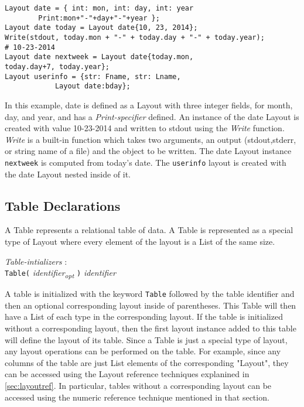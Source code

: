 \documentclass{article}
\begin{document}
\begin{lstlisting}
Layout date = { int: mon, int: day, int: year 
		Print:mon+"-"+day+"-"+year };
Layout date today = Layout date{10, 23, 2014};
Write(stdout, today.mon + "-" + today.day + "-" + today.year);
# 10-23-2014
Layout date nextweek = Layout date{today.mon, 
today.day+7, today.year};
Layout userinfo = {str: Fname, str: Lname, 	
			Layout date:bday};
\end{lstlisting}
In this example, date is defined as a Layout with three integer fields, for month, day, and year, and has a \emph{Print-specifier} defined. An instance of the date Layout is created with value 10-23-2014 and written to stdout using the \emph{Write} function. \emph{Write} is a built-in function which takes two arguments, an output (stdout,stderr, or string name of a file) and the object to be written. The date Layout instance \texttt{nextweek} is computed from today's date. The \texttt{userinfo} layout is created with the date Layout nested inside of it. 

\subsection{Table Declarations}
A Table represents a relational table of data. A Table is represented as a special type of Layout where every element of the layout is a List of the same size.

\begin{tabbing}
	\= \emph{Table}\=\emph{-intializers} : \\
		\> \> \texttt{Table}\texttt{(} \emph{identifier\textsubscript{opt}} \texttt{)} \emph{identifier} 
\end{tabbing}

A table is initialized with the keyword \texttt{Table} followed by the table identifier and then an optional corresponding layout inside of parentheses. This Table will then have a List of each type in the corresponding layout. If the table is initialized without a corresponding layout, then the first layout instance added to this table will define the layout of its table. Since a Table is just a special type of layout, any layout operations can be performed on the table. For example, since any columns of the table are just List elements of the corresponding "Layout", they can be accessed using the Layout reference techniques explanined in \ref{sec:layoutref}. In particular, tables without a corresponding layout can be accessed using the numeric reference technique mentioned in that section.
\end{document}
